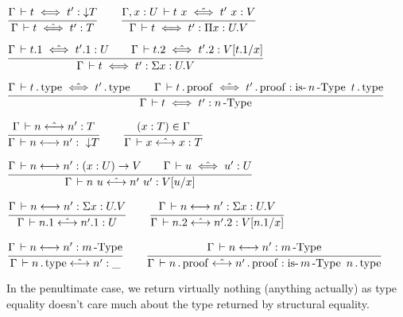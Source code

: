 \documentclass[a4paper,english]{lipics-utf8x}
\begin{document}

  \begin{center}
  \(
    \ru{\Gamma \der t \iff t' : \red T
      }{\Gamma \der t \hiff t' : T}
    \qquad
    \ru{\Gamma, x:U \der t~x \hiff t'~x : V
      }{\Gamma \der t \iff t' : \Pi x:U.V}
  \)
  \end{center}

  \begin{center}
  \(
    \ru{\Gamma \der t.1 \hiff t'.1 : U \qquad
        \Gamma \der t.2 \hiff t'.2 : V[t.1/x]
      }{\Gamma \der t \iff t' : \Sigma x:U.V}
  \)
  \end{center}

  \begin{center}
  \(
    \ru{\Gamma \der t \gettype \hiff t' \gettype \qquad
        \Gamma \der t \getproof \hiff t' \getproof : \isnType{n}{t \gettype}
      }{\Gamma \der t \iff t' : \nType{n}}
  \)
  \end{center}


  \begin{center}
  \(
    \ru{\Gamma \der n \hsteq n' : T
      }{\Gamma \der n \steq n' :\ \red T}
    \qquad
    \ru{(x:T) \in \Gamma
      }{\Gamma \der x \hsteq x : T}
  \)
  \end{center}

  \begin{center}
  \(
    \ru{\Gamma \der n \steq n' : (x:U) \to V \qquad
        \Gamma \der u \hiff u' : U
      }{\Gamma \der n~u \hsteq n'~u' : V[u/x]}
  \)
  \end{center}

  \begin{center}
  \(
    \ru{\Gamma \der n \steq n' : \Sigma x:U.V
      }{\Gamma \der n.1 \hsteq n'.1 : U}
    \qquad
    \ru{\Gamma \der n \steq n' : \Sigma x:U.V
      }{\Gamma \der n.2 \hsteq n'.2 : V[n.1/x]}
  \)
  \end{center}

  \begin{center}
  \(
    \ru{\Gamma \der n \steq n' : \nType{m}
      }{\Gamma \der n \gettype \hsteq n' : \_}
    \qquad
    \ru{\Gamma \der n \steq n' : \nType{m}
      }{\Gamma \der n \getproof \hsteq n' \getproof : \isnType{m}{n \gettype}}
  \)
  \end{center}

  In the penultimate case, we return virtually nothing (anything actually) as
  type equality doesn't care much about the type returned by structural
  equality.
\end{document}
